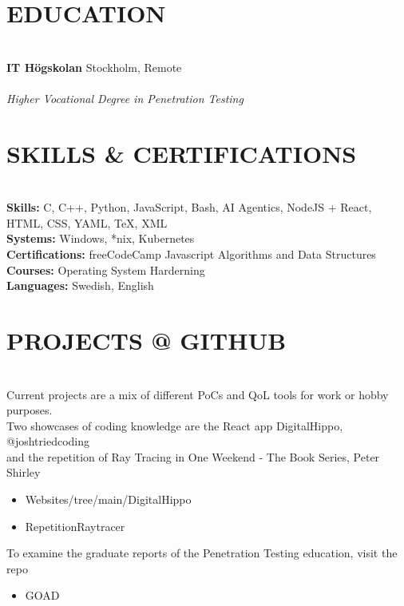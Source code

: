 \documentclass[10pt, a4paper]{article}
\begin{document}
\section*{EDUCATION}
\texttt{}\\[-0.5cm]
\textbf{IT Högskolan} \hfill Stockholm, Remote\\
\noindent{}\\
\textit{Higher Vocational Degree in Penetration Testing}
\newpage
\vspace*{1.4cm}
\section*{SKILLS \& CERTIFICATIONS}
\texttt{}\\[-0.5cm]
\textbf{Skills:} C, C++, Python, JavaScript, Bash, AI Agentics, NodeJS + React, HTML, CSS, YAML, TeX, XML\\
\textbf{Systems:} Windows, *nix, Kubernetes\\
\textbf{Certifications:} freeCodeCamp Javascript Algorithms and Data Structures\\
\textbf{Courses:} Operating System Harderning\\
\textbf{Languages:} Swedish, English
\section*{PROJECTS @ GITHUB}
\texttt{}\\[-0.5cm]
Current projects are a mix of different PoCs and QoL tools for work or hobby purposes.\\
Two showcases of coding knowledge are the React app DigitalHippo, @joshtriedcoding\\
and the repetition of Ray Tracing in One Weekend - The Book Series, Peter Shirley
\begin{itemize}[leftmargin=0.3cm, itemsep=0.1cm]
\item Websites/tree/main/DigitalHippo
\item RepetitionRaytracer
\end{itemize}
To examine the graduate reports of the Penetration Testing education, visit the repo
\begin{itemize}[leftmargin=0.3cm, itemsep=0.1cm]
\item GOAD
\end{itemize}
\end{document}

